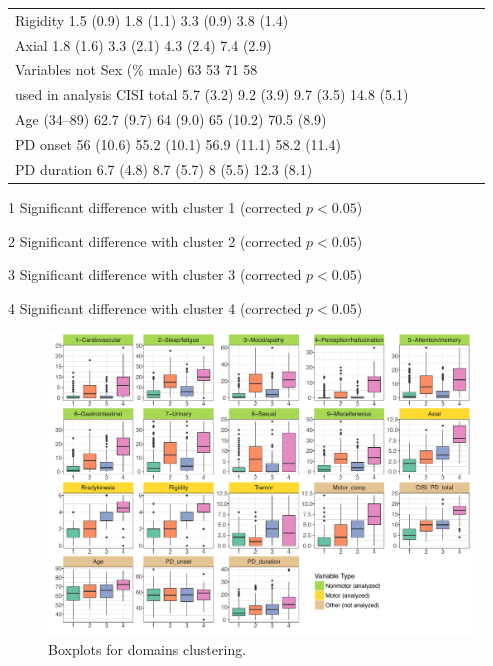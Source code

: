 \documentclass[preprint,5p]{elsarticle} %
\begin{document}
\begin{table}[t]
\begin{threeparttable}
\begin{tabular}{lrllll}
    	 Rigidity 	 1.5 (0.9)\tnote{234} 	 1.8 (1.1)\tnote{134} 	 3.3 (0.9)\tnote{124} 	3.8 (1.4)\tnote{123} \\
    	 Axial 	 1.8 (1.6)\tnote{234} 	 3.3 (2.1)\tnote{134} 	 4.3 (2.4)\tnote{124} 	7.4 (2.9)\tnote{123} \\
    \midrule
    Variables not 	 Sex (\% male) 	 63 	 53\tnote{3} 	 71\tnote{2} 	 58 \\
    used in analysis 	 CISI total 	 5.7 (3.2)\tnote{234} 	 9.2 (3.9)\tnote{14} 	 9.7 (3.5)\tnote{14} 	 14.8 (5.1)\tnote{123} \\
    	 Age (34--89) 	 62.7 (9.7)\tnote{34} 	 64 (9.0)\tnote{4} 	 65 (10.2)\tnote{14} 	 70.5 (8.9)\tnote{123} \\
    	 PD onset 	 56 (10.6) 	 55.2 (10.1) 	 56.9 (11.1) 	 58.2 (11.4) \\
    	 PD duration 	 6.7 (4.8)\tnote{234} 	 8.7 (5.7)\tnote{14} 	 8 (5.5)\tnote{14} 	12.3 (8.1)\tnote{123} \\
    \bottomrule
  \end{tabular}
  \begin{tablenotes}
    \small
    \item[1] Significant difference with cluster 1 (corrected $p < 0.05$)
    \item[2] Significant difference with cluster 2 (corrected $p < 0.05$)
    \item[3] Significant difference with cluster 3 (corrected $p < 0.05$)
    \item[4] Significant difference with cluster 4 (corrected $p < 0.05$)
  \end{tablenotes}
  \end{threeparttable}
\end{table}

\begin{figure}[b]
  \centering
  \includegraphics[width=\linewidth]{kmeans-summaries-4-pub.pdf}
  \vspace{-7.5em}
  \captionsetup{justification=raggedleft,
    singlelinecheck=false
  }
  \caption{Boxplots for domains clustering.}
  \label{fig:box}
\end{figure}
\end{document}
